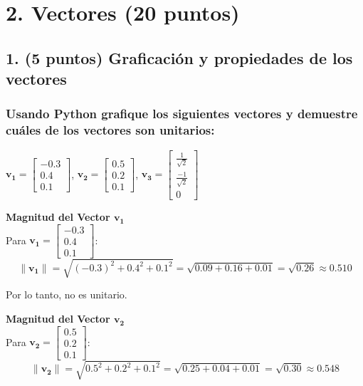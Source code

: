 \documentclass[12 pt]{article}
\begin{document}
\section*{2. Vectores (20 puntos)}

\subsection*{1. (5 puntos) Graficación y propiedades de los vectores}

\subsubsection*{Usando Python grafique los siguientes vectores y demuestre cuáles de los vectores son unitarios:}

\begin{center}
    $\mathbf{v_1} = \begin{bmatrix} -0.3 \\ 0.4 \\ 0.1 \end{bmatrix}$, $\mathbf{v_2} = \begin{bmatrix} 0.5 \\ 0.2 \\ 0.1 \end{bmatrix}$, $\mathbf{v_3} = \begin{bmatrix} \frac{1}{\sqrt{2}} \\ \frac{-1}{\sqrt{2}} \\ 0 \end{bmatrix}$
\end{center}

\textbf{Magnitud del Vector \(\mathbf{v_1}\)}\\

Para \(\mathbf{v_1} = \begin{bmatrix} -0.3 \\ 0.4 \\ 0.1 \end{bmatrix}\):
\[
\|\mathbf{v_1}\| = \sqrt{(-0.3)^2 + 0.4^2 + 0.1^2}
= \sqrt{0.09 + 0.16 + 0.01}
= \sqrt{0.26}
\approx 0.510
\]

\begin{center}
Por lo tanto, no es unitario.\\
\end{center}

\textbf{Magnitud del Vector \(\mathbf{v_2}\)}\\

Para \(\mathbf{v_2} = \begin{bmatrix} 0.5 \\ 0.2 \\ 0.1 \end{bmatrix}\):
\[
\|\mathbf{v_2}\| = \sqrt{0.5^2 + 0.2^2 + 0.1^2}
= \sqrt{0.25 + 0.04 + 0.01}
= \sqrt{0.30}
\approx 0.548
\]
\end{document}
